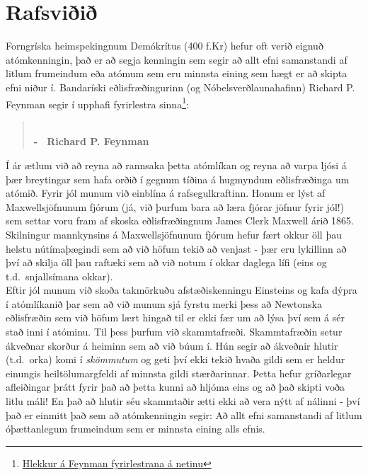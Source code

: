 

\chapter{Rafsviðið}


Forngríska heimspekingnum Demókrítus (400 f.Kr) hefur oft verið eignuð atómkenningin, það er að segja kenningin sem segir að allt efni samanstandi af litlum frumeindum eða atómum sem eru minnsta eining sem hægt er að skipta efni niður í. Bandaríski eðlisfræðingurinn (og Nóbelsverðlaunahafinn) Richard P. Feynman segir í upphafi fyrirlestra sinna\footnote{\href{https://www.feynmanlectures.caltech.edu/}{Hlekkur á Feynman fyrirlestrana á netinu}}:

\blockquote{ \\ \phantom{.} \hfill \textbf{- \, Richard P. Feynman}}

Í ár ætlum við að reyna að rannsaka þetta atómlíkan og reyna að varpa ljósi á þær breytingar sem hafa orðið í gegnum tíðina á hugmyndum eðlisfræðinga um atómið. Fyrir jól munum við einblína á rafsegulkraftinn. Honum er lýst af Maxwellsjöfnunum fjórum (já, við þurfum bara að læra fjórar jöfnur fyrir jól!) sem settar voru fram af skoska eðlisfræðingnum James Clerk Maxwell árið 1865. Skilningur mannkynsins á Maxwellsjöfnunum fjórum hefur fært okkur öll þau helstu nútímaþægindi sem að við höfum tekið að venjast - þær eru lykillinn að því að skilja öll þau raftæki sem að við notum í okkar daglega lífi (eins og t.d.~snjallsímana okkar). \\

Eftir jól munum við skoða takmörkuðu afstæðiskenningu Einsteins og kafa dýpra í atómlíkanið þar sem að við munum sjá fyrstu merki þess að Newtonska eðlisfræðin sem við höfum lært hingað til er ekki fær um að lýsa því sem á sér stað inni í atóminu. Til þess þurfum við skammtafræði. Skammtafræðin setur ákveðnar skorður á heiminn sem að við búum í. Hún segir að ákveðnir hlutir (t.d.~orka) komi í \emph{skömmutum} og geti því ekki tekið hvaða gildi sem er heldur einungis heiltölumargfeldi af minnsta gildi stærðarinnar. Þetta hefur gríðarlegar afleiðingar þrátt fyrir það að þetta kunni að hljóma eins og að það skipti voða litlu máli! En það að hlutir séu skammtaðir ætti ekki að vera nýtt af nálinni - því það er einmitt það sem að atómkenningin segir: Að allt efni samanstandi af litlum óþættanlegum frumeindum sem er minnsta eining alls efnis. \\



